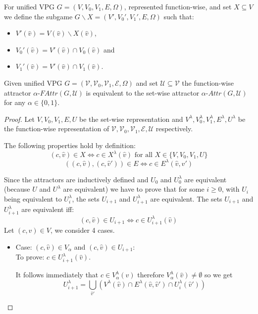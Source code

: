 \begin{definition}
	\label{def_Usubgame}
	For unified VPG $G = (V,V_0,V_1,E,\Omega)$, represented function-wise, and set $X \subseteq V$ we define the subgame $G \backslash X = (V',V_0',V_1',E,\Omega)$ such that:
	\begin{itemize}
		\item $V'(\hat{v}) = V(\hat{v}) \backslash X(\hat{v})$,
		\item $V_0'(\hat{v}) = V'(\hat{v}) \cap V_0(\hat{v})$ and
		\item $V_1'(\hat{v}) = V'(\hat{v}) \cap V_1(\hat{v})$.
	\end{itemize}
\end{definition}

\begin{lemma}
	\label{lem_attr_equal}
	Given unified VPG $G = (\mathcal{V},\mathcal{V}_0,\mathcal{V}_1, \mathcal{E}, \Omega)$ and set $\mathcal{U} \subseteq \mathcal{V}$ the function-wise attractor $\alpha\textit{-FAttr}(G,\mathcal{U})$ is equivalent to the set-wise attractor $\alpha\textit{-Attr}(G,\mathcal{U})$ for any $\alpha \in \{0,1\}$.
	\begin{proof}
		Let $V,V_0,V_1,E,U$ be the set-wise representation and $V^\lambda,V_0^\lambda,V_1^\lambda,E^\lambda,U^\lambda$ be the function-wise representation of $\mathcal{V},\mathcal{V}_0,\mathcal{V}_1,\mathcal{E},\mathcal{U}$ respectively.
		
		The following properties hold by definition:
		\[ (c,\hat{v}) \in X \iff c \in X^\lambda(\hat{v})\text{ for all } X\in \{V,V_0,V_1,U\}\]
		\[ ((c,\hat{v}),(c,\hat{v}')) \in E \iff c \in E^\lambda(\hat{v},\hat{v}') \]
		
		Since the attractors are inductively defined and $U_0$ and $U^\lambda_0$ are equivalent (because $U$ and $U^\lambda$ are equivalent) we have to prove that for some $i \geq 0$, with $U_i$ being equivalent to $U^\lambda_i$, the sets $U_{i+1}$ and $U^\lambda_{i+1}$ are equivalent. The sets $U_{i+1}$ and $U^\lambda_{i+1}$ are equivalent iff:
		\[ (c,\hat{v}) \in U_{i+1} \iff c \in U^\lambda_{i+1}(\hat{v}) \]
		Let $(c,\hat{v}) \in V$, we consider 4 cases.
		\begin{itemize}
			\item Case: $(c, \hat{v}) \in V_{\alpha}$ and $(c,\hat{v}) \in U_{i+1}$:\\
			To prove: $c \in U^\lambda_{i+1}(\hat{v})$.
			
			
			It follows immediately that $c \in V^\lambda_{\alpha}(\hat{v})$ therefore $V^\lambda_{\alpha}(\hat{v}) \neq \emptyset$ so we get
			\[ U^\lambda_{i+1} =\bigcup_{\hat{v}'} (V^\lambda(\hat{v}) \cap E^\lambda(\hat{v},\hat{v}') \cap U^\lambda_i(\hat{v}')) \]
			

\end{itemize}
\end{proof}
\end{lemma}

